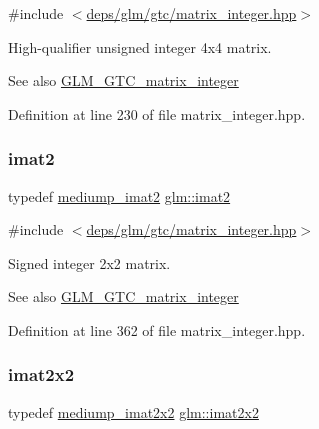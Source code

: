 {\ttfamily \#include $<$\hyperlink{matrix__integer_8hpp}{deps/glm/gtc/matrix\+\_\+integer.\+hpp}$>$}

High-\/qualifier unsigned integer 4x4 matrix. \begin{DoxySeeAlso}{See also}
\hyperlink{group__gtc__matrix__integer}{G\+L\+M\+\_\+\+G\+T\+C\+\_\+matrix\+\_\+integer} 
\end{DoxySeeAlso}


Definition at line 230 of file matrix\+\_\+integer.\+hpp.

\mbox{\label{group__gtc__matrix__integer_ga77a581b3366fb63fc72f8f20830003e0}} 
\subsubsection{\texorpdfstring{imat2}{imat2}}
{\footnotesize\ttfamily typedef \hyperlink{group__gtc__matrix__integer_ga74e065ab9524e6b7bd5a84cffb758e71}{mediump\+\_\+imat2} \hyperlink{group__gtc__matrix__integer_ga77a581b3366fb63fc72f8f20830003e0}{glm\+::imat2}}



{\ttfamily \#include $<$\hyperlink{matrix__integer_8hpp}{deps/glm/gtc/matrix\+\_\+integer.\+hpp}$>$}

Signed integer 2x2 matrix. \begin{DoxySeeAlso}{See also}
\hyperlink{group__gtc__matrix__integer}{G\+L\+M\+\_\+\+G\+T\+C\+\_\+matrix\+\_\+integer} 
\end{DoxySeeAlso}


Definition at line 362 of file matrix\+\_\+integer.\+hpp.

\mbox{\label{group__gtc__matrix__integer_gaf7f44f44d966377666d41ed059524732}} 
\subsubsection{\texorpdfstring{imat2x2}{imat2x2}}
{\footnotesize\ttfamily typedef \hyperlink{group__gtc__matrix__integer_gafe326375aa42c0abbe571d376f4cbd95}{mediump\+\_\+imat2x2} \hyperlink{group__gtc__matrix__integer_gaf7f44f44d966377666d41ed059524732}{glm\+::imat2x2}}



